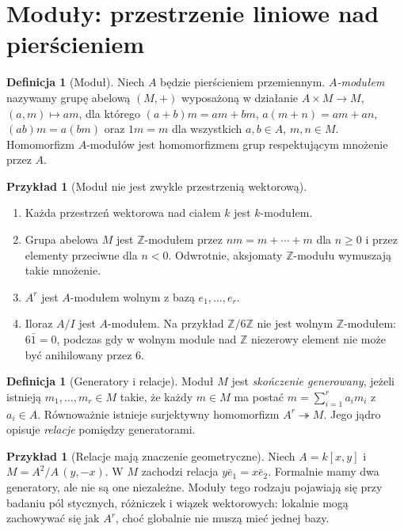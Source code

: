 \documentclass[11pt,a4paper,openany]{report}
\numberwithin{equation}{section}
\theoremstyle{plain}
\theoremstyle{definition}
\newtheorem{definicja}[twierdzenie]{Definicja}
\newtheorem{przyklad}[twierdzenie]{Przykład}
\theoremstyle{remark}
\newcommand{\Z}{\mathbb Z}
\begin{document}
\section{Moduły: przestrzenie liniowe nad pierścieniem}
\label{sec:moduly}

\begin{definicja}[Moduł]
Niech $A$ będzie pierścieniem przemiennym. \emph{$A$-modułem}
nazywamy grupę abelową $(M,+)$ wyposażoną w działanie
$A\times M\to M$, $(a,m)\mapsto am$, dla którego
$(a+b)m=am+bm$, $a(m+n)=am+an$,
$(ab)m=a(bm)$ oraz $1m=m$ dla wszystkich
$a,b\in A$, $m,n\in M$. Homomorfizm $A$-modułów
jest homomorfizmem grup respektującym mnożenie przez $A$.
\end{definicja}

\begin{przyklad}[Moduł nie jest zwykle przestrzenią wektorową]
\begin{enumerate}[label=\alph*)]
\item Każda przestrzeń wektorowa nad ciałem $k$ jest $k$-modułem.
\item Grupa abelowa $M$ jest $\Z$-modułem przez
$nm=m+\cdots+m$ dla $n\ge0$ i przez elementy przeciwne
dla $n<0$. Odwrotnie, aksjomaty $\Z$-modułu wymuszają
takie mnożenie.
\item $A^r$ jest $A$-modułem wolnym z bazą $e_1,\ldots,e_r$.
\item Iloraz $A/I$ jest $A$-modułem. Na przykład
$\Z/6\Z$ nie jest wolnym $\Z$-modułem: $6\bar1=0$,
podczas gdy w wolnym module nad $\Z$ niezerowy element
nie może być anihilowany przez $6$.
\end{enumerate}
\end{przyklad}

\begin{definicja}[Generatory i relacje]
Moduł $M$ jest \emph{skończenie generowany}, jeżeli istnieją
$m_1,\ldots,m_r\in M$ takie, że każdy $m\in M$ ma postać
$m=\sum_{i=1}^r a_i m_i$ z $a_i\in A$.
Równoważnie istnieje surjektywny homomorfizm
$A^r\twoheadrightarrow M$. Jego jądro opisuje
\emph{relacje} pomiędzy generatorami.
\end{definicja}

\begin{przyklad}[Relacje mają znaczenie geometryczne]
Niech $A=k[x,y]$ i $M=A^2/A\,(y,-x)$.
W $M$ zachodzi relacja $y\bar e_1=x\bar e_2$.
Formalnie mamy dwa generatory, ale nie są one niezależne.
Moduły tego rodzaju pojawiają się przy badaniu pól
stycznych, różniczek i wiązek wektorowych: lokalnie
mogą zachowywać się jak $A^r$, choć globalnie
nie muszą mieć jednej bazy.
\end{przyklad}
\end{document}
